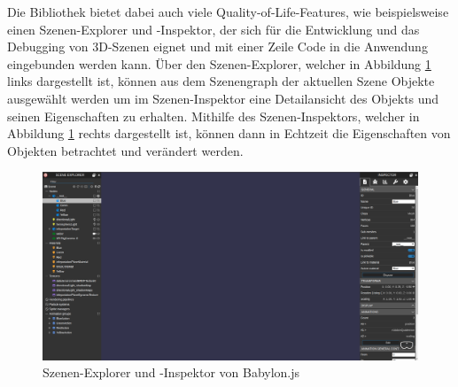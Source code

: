 Die Bibliothek bietet dabei auch viele Quality-of-Life-Features, wie beispielsweise einen Szenen-Explorer und -Inspektor, der sich für die Entwicklung und das Debugging von 3D-Szenen eignet und mit einer Zeile Code in die Anwendung eingebunden werden kann.
Über den Szenen-Explorer, welcher in Abbildung \ref{fig:babylon-inspector} links dargestellt ist, können aus dem Szenengraph der aktuellen Szene Objekte ausgewählt werden um im Szenen-Inspektor eine Detailansicht des Objekts und seinen Eigenschaften zu erhalten.
Mithilfe des Szenen-Inspektors, welcher in Abbildung \ref{fig:babylon-inspector} rechts dargestellt ist,  können dann in Echtzeit die Eigenschaften von Objekten betrachtet und verändert werden.

\begin{figure}[H]
  \centering
  \includegraphics[width=1\textwidth]{images/Babylon-Inspector.png}
  \caption{Szenen-Explorer und -Inspektor von Babylon.js}
  \label{fig:babylon-inspector}
\end{figure}
